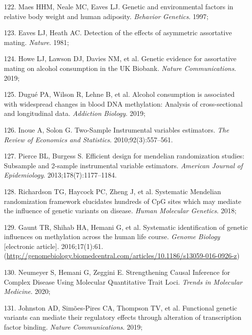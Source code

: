 \documentclass[11pt,twoside]{bristolthesis}
\newenvironment{cslreferences}%
  {}%
  {\par}
\begin{document}
\begin{cslreferences}
\leavevmode\hypertarget{ref-Maes1997}{}%
122. Maes HHM, Neale MC, Eaves LJ. Genetic and environmental factors in relative body weight and human adiposity. \emph{Behavior Genetics}. 1997;

\leavevmode\hypertarget{ref-Eaves1981}{}%
123. Eaves LJ, Heath AC. Detection of the effects of asymmetric assortative mating. \emph{Nature}. 1981;

\leavevmode\hypertarget{ref-Howe2019}{}%
124. Howe LJ, Lawson DJ, Davies NM, et al. Genetic evidence for assortative mating on alcohol consumption in the UK Biobank. \emph{Nature Communications}. 2019;

\leavevmode\hypertarget{ref-Dugue2019}{}%
125. Dugué PA, Wilson R, Lehne B, et al. Alcohol consumption is associated with widespread changes in blood DNA methylation: Analysis of cross-sectional and longitudinal data. \emph{Addiction Biology}. 2019;

\leavevmode\hypertarget{ref-Inoue2010}{}%
126. Inoue A, Solon G. Two-Sample Instrumental variables estimators. \emph{The Review of Economics and Statistics}. 2010;92(3):557--561.

\leavevmode\hypertarget{ref-Pierce2013}{}%
127. Pierce BL, Burgess S. Efficient design for mendelian randomization studies: Subsample and 2-sample instrumental variable estimators. \emph{American Journal of Epidemiology}. 2013;178(7):1177--1184.

\leavevmode\hypertarget{ref-Richardson2018}{}%
128. Richardson TG, Haycock PC, Zheng J, et al. Systematic Mendelian randomization framework elucidates hundreds of CpG sites which may mediate the influence of genetic variants on disease. \emph{Human Molecular Genetics}. 2018;

\leavevmode\hypertarget{ref-Gaunt2016}{}%
129. Gaunt TR, Shihab HA, Hemani G, et al. Systematic identification of genetic influences on methylation across the human life course. \emph{Genome Biology} {[}electronic article{]}. 2016;17(1):61. (\url{http://genomebiology.biomedcentral.com/articles/10.1186/s13059-016-0926-z})

\leavevmode\hypertarget{ref-Neumeyer2020}{}%
130. Neumeyer S, Hemani G, Zeggini E. Strengthening Causal Inference for Complex Disease Using Molecular Quantitative Trait Loci. \emph{Trends in Molecular Medicine}. 2020;

\leavevmode\hypertarget{ref-Johnston2019}{}%
131. Johnston AD, Simões-Pires CA, Thompson TV, et al. Functional genetic variants can mediate their regulatory effects through alteration of transcription factor binding. \emph{Nature Communications}. 2019;


\end{cslreferences}
\end{document}
